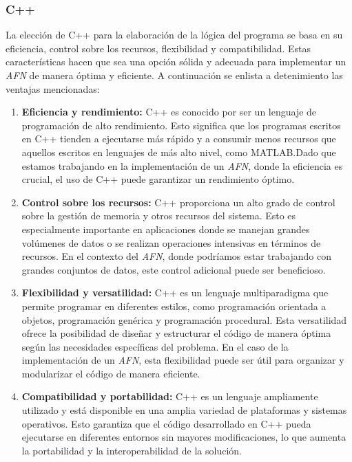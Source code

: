 \documentclass{article}
\begin{document}
        \subsubsection{C++}
            La elección de C++ para la elaboración de la lógica del programa se basa en su eficiencia, control sobre los recursos,
            flexibilidad y compatibilidad. Estas características hacen que sea una opción sólida y adecuada para implementar un \textit{AFN}
            de manera óptima y eficiente. A continuación se enlista a detenimiento las ventajas mencionadas:
            \begin{enumerate}
                \item \textbf{Eficiencia y rendimiento:} C++ es conocido por ser un lenguaje de programación de alto rendimiento.
                Esto significa que los programas escritos en C++ tienden a ejecutarse más rápido y a consumir menos recursos que aquellos
                escritos en lenguajes de más alto nivel, como MATLAB.\@ Dado que estamos trabajando en la implementación de un \textit{AFN},
                donde la eficiencia es crucial, el uso de C++ puede garantizar un rendimiento óptimo.

                \item \textbf{Control sobre los recursos:} C++ proporciona un alto grado de control sobre la gestión de memoria y otros
                recursos del sistema. Esto es especialmente importante en aplicaciones donde se manejan grandes volúmenes de datos o se
                realizan operaciones intensivas en términos de recursos. En el contexto del \textit{AFN}, donde podríamos
                estar trabajando con grandes conjuntos de datos, este control adicional puede ser beneficioso.

                \item \textbf{Flexibilidad y versatilidad:} C++ es un lenguaje multiparadigma que permite programar en diferentes estilos,
                como programación orientada a objetos, programación genérica y programación procedural. Esta versatilidad ofrece la
                posibilidad de diseñar y estructurar el código de manera óptima según las necesidades específicas del problema. En el caso
                de la implementación de un \textit{AFN}, esta flexibilidad puede ser útil para organizar y modularizar el código
                de manera eficiente.

                \item \textbf{Compatibilidad y portabilidad:} C++ es un lenguaje ampliamente utilizado y está disponible en una amplia
                variedad de plataformas y sistemas operativos. Esto garantiza que el código desarrollado en C++ pueda ejecutarse en
                diferentes entornos sin mayores modificaciones, lo que aumenta la portabilidad y la interoperabilidad de la solución.
            \end{enumerate}
\end{document}
